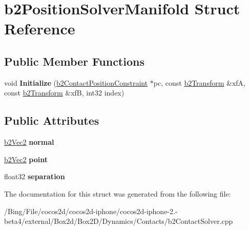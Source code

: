 \hypertarget{structb2_position_solver_manifold}{\section{b2\-Position\-Solver\-Manifold Struct Reference}
\label{structb2_position_solver_manifold}
}
\subsection*{Public Member Functions}
\begin{DoxyCompactItemize}
\item 
\hypertarget{structb2_position_solver_manifold_affdfc2c9f455008e865b2dd6947796fa}{void {\bfseries Initialize} (\hyperlink{structb2_contact_position_constraint}{b2\-Contact\-Position\-Constraint} $\ast$pc, const \hyperlink{structb2_transform}{b2\-Transform} \&xf\-A, const \hyperlink{structb2_transform}{b2\-Transform} \&xf\-B, int32 index)}\label{structb2_position_solver_manifold_affdfc2c9f455008e865b2dd6947796fa}

\end{DoxyCompactItemize}
\subsection*{Public Attributes}
\begin{DoxyCompactItemize}
\item 
\hypertarget{structb2_position_solver_manifold_a4a1073e69ab49f55b7013d4aef96fe1c}{\hyperlink{structb2_vec2}{b2\-Vec2} {\bfseries normal}}\label{structb2_position_solver_manifold_a4a1073e69ab49f55b7013d4aef96fe1c}

\item 
\hypertarget{structb2_position_solver_manifold_a9b7a88173cc0295e2883e2ac8b7c46f2}{\hyperlink{structb2_vec2}{b2\-Vec2} {\bfseries point}}\label{structb2_position_solver_manifold_a9b7a88173cc0295e2883e2ac8b7c46f2}

\item 
\hypertarget{structb2_position_solver_manifold_a9dd76b0c774238d3e3745d139cf6eea4}{float32 {\bfseries separation}}\label{structb2_position_solver_manifold_a9dd76b0c774238d3e3745d139cf6eea4}

\end{DoxyCompactItemize}


The documentation for this struct was generated from the following file\-:\begin{DoxyCompactItemize}
\item 
/\-Bing/\-File/cocos2d/cocos2d-\/iphone/cocos2d-\/iphone-\/2.-\/beta4/external/\-Box2d/\-Box2\-D/\-Dynamics/\-Contacts/b2\-Contact\-Solver.\-cpp\end{DoxyCompactItemize}
